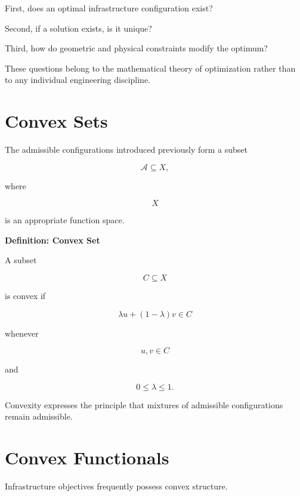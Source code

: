 \documentclass[11pt,fleqn]{book}
\numberwithin{equation}{chapter}
\newenvironment{definition}[1]
  {\begin{definitionEnv}
   \noindent\textbf{Definition: #1}\par\smallskip}
  {\end{definitionEnv}}
\theoremstyle{plain}
\theoremstyle{definition}
\theoremstyle{remark}
\begin{document}
First, does an optimal infrastructure configuration exist?

Second, if a solution exists, is it unique?

Third, how do geometric and physical constraints modify the optimum?

These questions belong to the mathematical theory of optimization rather
than to any individual engineering discipline.


\section{Convex Sets}

The admissible configurations introduced previously form a subset

\[
\mathcal A
\subseteq
X,
\]

where

\[
X
\]

is an appropriate function space.


\begin{definition}{Convex Set}

A subset

\[
C\subseteq X
\]

is convex if

\[
\lambda u
+
(1-\lambda)v
\in C
\]

whenever

\[
u,v\in C
\]

and

\[
0\le\lambda\le1.
\]

\end{definition}

Convexity expresses the principle that mixtures of admissible
configurations remain admissible.


\section{Convex Functionals}

Infrastructure objectives frequently possess convex structure.

\end{document}
